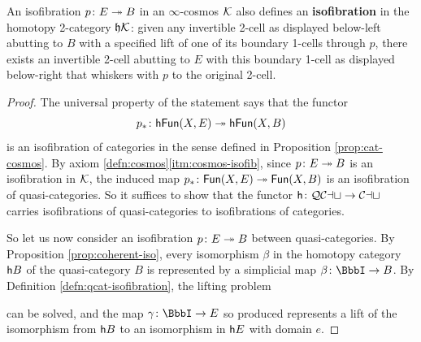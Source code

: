   \begin{proposition}\label{prop:isofib-define-isofib}
     An isofibration $p \colon E \twoheadrightarrow B$  in an $\infty$-cosmos ${\mathord{\mathcal{K}}}$ also defines an \textbf{isofibration} in the homotopy 2-category $\mathfrak{h}{\mathord{\mathcal{K}}}$: given any invertible 2-cell as displayed below-left abutting to $B$ with a specified lift of one of its boundary 1-cells through $p$, there exists an invertible 2-cell abutting to $E$ with this boundary 1-cell as displayed below-right that whiskers with $p$ to the original 2-cell.
  \begin{center}
  \end{center}
  \end{proposition}
  \begin{proof} The universal property of the statement says that the functor \[p_* \colon {\mathord{\mathsf{hFun}}}(X,E) \twoheadrightarrow {\mathord{\mathsf{hFun}}}(X,B)\] is an isofibration of categories in the sense defined in Proposition \ref{prop:cat-cosmos}. By axiom \ref{defn:cosmos}\ref{itm:cosmos-isofib}, since $p \colon E \twoheadrightarrow B$ is an isofibration in ${\mathord{\mathcal{K}}}$, the induced map $p_* \colon {\mathord{\mathsf{Fun}}}(X,E) \twoheadrightarrow {\mathord{\mathsf{Fun}}}(X,B)$ is an isofibration of quasi-categories. So it suffices to show that the functor ${\mathord{\mathsf{h}}} \colon {\mathord{\mathcal{QCat}}}\to {\mathord{\mathcal{Cat}}}$ carries isofibrations of quasi-categories to isofibrations of categories.

  So let us now consider an isofibration $p \colon E \twoheadrightarrow B$ between quasi-categories. By Proposition \ref{prop:coherent-iso}, every isomorphism $\beta$ in the homotopy category ${\mathord{\mathsf{h}}}{B}$ of the quasi-category $B$ is represented by a simplicial map $\beta \colon \iso \to B$. By Definition \ref{defn:qcat-isofibration}, the lifting problem
  \begin{center}
  \end{center}
  can be solved, and the map $\gamma \colon \iso \to E$ so produced represents a lift of the isomorphism from ${\mathord{\mathsf{h}}}{B}$ to an isomorphism in ${\mathord{\mathsf{h}}}{E}$ with domain $e$.
  \end{proof}

